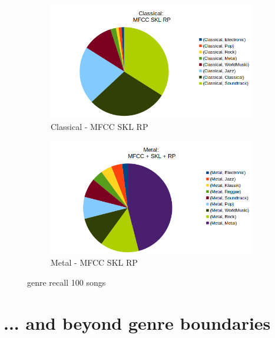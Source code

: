 \begin{figure}[htbp]
{{			\begin{subfigure}{.495\textwidth}
				\centering    
				\includegraphics[scale=0.48]{Images/SparkFeat/Classical_MFCC_SKL_RP.png}
				\caption{Classical - MFCC SKL RP}
				\label{cmsr}
			\end{subfigure}
			\begin{subfigure}{.495\textwidth}
				\centering     
				\includegraphics[scale=0.48]{Images/SparkFeat/Metal_MFCC_SKL_RP.png}
				\caption{Metal - MFCC SKL RP}
				\label{mfsr}
			\end{subfigure}%
	}}
	\caption{genre recall 100 songs}
	\label{fig:genrerec}
\end{figure}


\section{... and beyond genre boundaries}

